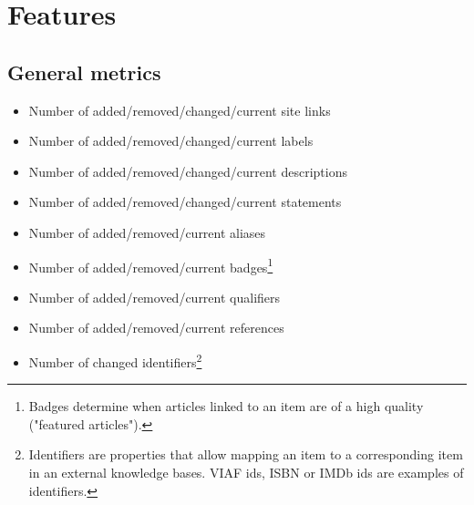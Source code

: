 \documentclass{sig-alternate}
\begin{document}
\section{Features}
\subsection{General metrics}
\begin{itemize}
\item Number of added/removed/changed/current site links
\item Number of added/removed/changed/current labels
\item Number of added/removed/changed/current descriptions
\item Number of added/removed/changed/current statements
\item Number of added/removed/current aliases
\item Number of added/removed/current badges\footnote{Badges determine when articles linked to an item are of a high quality ("featured articles").}
\item Number of added/removed/current qualifiers
\item Number of added/removed/current references
\item Number of changed identifiers\footnote{Identifiers are properties that allow mapping an item to a corresponding item in an external knowledge bases. VIAF ids, ISBN or IMDb ids are examples of identifiers.}
\end{itemize}
\end{document}
